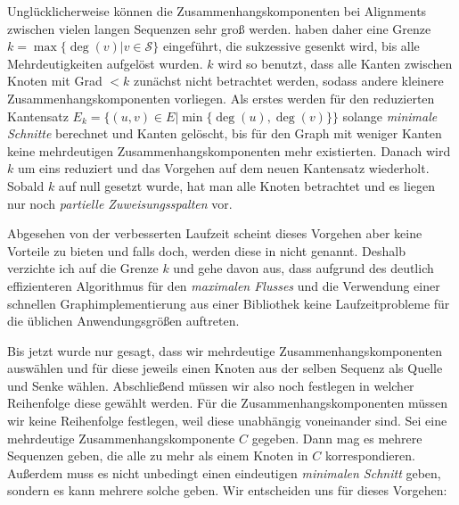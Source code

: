 Unglücklicherweise können die Zusammenhangskomponenten bei Alignments zwischen vielen langen Sequenzen sehr groß werden. \cite{cpm10} haben daher eine Grenze $k = \max\{\deg(v)| v \in \mathcal{S}\}$ eingeführt, die sukzessive gesenkt wird, bis alle Mehrdeutigkeiten aufgelöst wurden. $k$ wird so benutzt, dass alle Kanten zwischen Knoten mit Grad $< k$ zunächst nicht betrachtet werden, sodass andere kleinere Zusammenhangskomponenten vorliegen. Als erstes werden für den reduzierten Kantensatz $E_k = \{(u,v) \in E|\min\{\deg(u),\deg(v)\}\}$ solange \emph{minimale Schnitte} berechnet und Kanten gelöscht, bis für den Graph mit weniger Kanten keine mehrdeutigen Zusammenhangskomponenten mehr existierten. Danach wird $k$ um eins reduziert und das Vorgehen auf dem neuen Kantensatz wiederholt. Sobald $k$ auf null gesetzt wurde, hat man alle Knoten betrachtet und es liegen nur noch \emph{partielle Zuweisungsspalten} vor. 

Abgesehen von der verbesserten Laufzeit scheint dieses Vorgehen aber keine Vorteile zu bieten und falls doch, werden diese in \cite{cpm10} nicht genannt. Deshalb verzichte ich auf die Grenze $k$ und gehe davon aus, dass aufgrund des deutlich effizienteren Algorithmus für den \emph{maximalen Flusses} und die Verwendung einer schnellen Graphimplementierung aus einer Bibliothek keine Laufzeitprobleme für die üblichen Anwendungsgrößen auftreten. 

Bis jetzt wurde nur gesagt, dass wir mehrdeutige Zusammenhangskomponenten auswählen und für diese jeweils einen Knoten aus der selben Sequenz als Quelle und Senke wählen. Abschließend müssen wir also noch festlegen in welcher Reihenfolge diese gewählt werden. Für die Zusammenhangskomponenten müssen wir keine Reihenfolge festlegen, weil diese unabhängig voneinander sind. Sei eine mehrdeutige Zusammenhangskomponente $C$ gegeben. Dann mag es mehrere Sequenzen geben, die alle zu mehr als einem Knoten in $C$ korrespondieren. Außerdem muss es nicht unbedingt einen eindeutigen \emph{minimalen Schnitt} geben, sondern es kann mehrere solche geben. Wir entscheiden uns für dieses Vorgehen:

